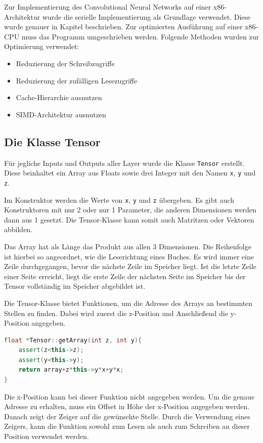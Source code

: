 \documentclass[../main.tex]{subfiles}
\begin{document}
Zur Implementierung des Convolutional Neural Networks auf einer x86-Architektur wurde die serielle Implementierung als Grundlage verwendet. Diese wurde genauer in Kapitel  beschrieben. Zur optimierten Ausführung auf einer x86-CPU muss das Programm umgeschrieben werden. Folgende Methoden wurden zur Optimierung verwendet:
\begin{itemize}
	\item Reduzierung der Schreibzugriffe
	\item Reduzierung der zufälligen Lesezugriffe
	\item Cache-Hierarchie ausnutzen
	\item SIMD-Architektur ausnutzen
\end{itemize}

\subsection{Die Klasse Tensor}
Für jegliche Inputs und Outputs aller Layer wurde die Klasse \texttt{Tensor} erstellt. Diese beinhaltet ein Array aus Floats sowie drei Integer mit den Namen \texttt{x}, \texttt{y} und \texttt{z}. \par 
Im Konstruktor werden die Werte von \texttt{x}, \texttt{y} und \texttt{z} übergeben. Es gibt auch Konstruktoren mit nur 2 oder nur 1 Parameter, die anderen Dimensionen werden dann aus 1 gesetzt. Die Tensor-Klasse kann somit auch Matritzen oder Vektoren abbilden. \par 
Das Array hat als Länge das Produkt aus allen 3 Dimensionen. Die Reihenfolge ist hierbei so angeordnet, wie die Leserichtung eines Buches. Es wird immer eine Zeile durchgegangen, bevor die nächste Zeile im Speicher liegt. Ist die letzte Zeile einer Seite erreicht, liegt die erste Zeile der nächsten Seite im Speicher bis der Tensor vollständig im Speicher abgebildet ist. \par
Die Tensor-Klasse bietet Funktionen, um die Adresse des Arrays an bestimmten Stellen zu finden. Dabei wird zuerst die z-Position und Anschließend die y-Position angegeben.
\begin{lstlisting}[language=c++, caption=Funktion zum Erhalten eines Pointers auf den Tensor, captionpos=b, label=listing:tensor_get_array, frame=single, linewidth=\textwidth, breaklines=true]
float *Tensor::getArray(int z, int y){
	assert(z<this->z);
	assert(y<this->y);
	return array+z*this->y*x+y*x;
}
\end{lstlisting}
Die x-Position kann bei dieser Funktion nicht angegeben werden. Um die genaue Adresse zu erhalten, muss ein Offset in Höhe der x-Position angegeben werden. Danach zeigt der Zeiger auf die gewünschte Stelle. Durch die Verwendung eines Zeigers, kann die Funktion sowohl zum Lesen als auch zum Schreiben an dieser Position verwendet werden.
\end{document}
